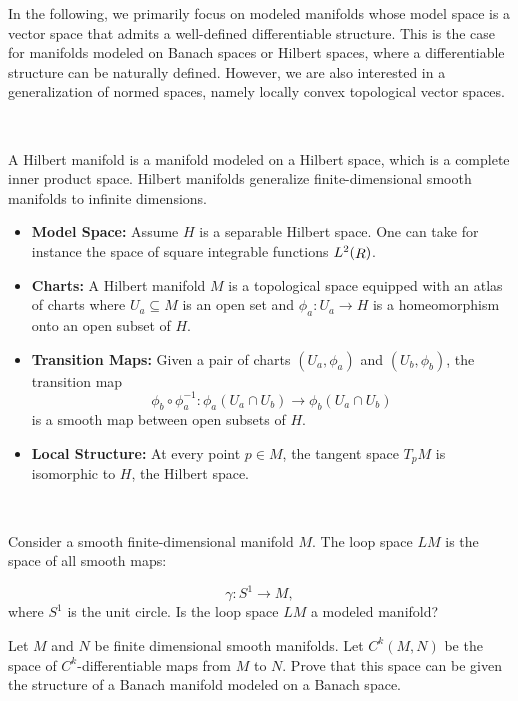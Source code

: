 \vspace{5pt}%

In the following, we primarily focus on modeled manifolds whose model space is a vector space that admits a well-defined differentiable structure. This is the case for manifolds modeled on Banach spaces or Hilbert spaces, where a differentiable structure can be naturally defined. However, we are also interested in a generalization of normed spaces, namely locally convex topological vector spaces. 

\, 
\begin{example}
A Hilbert manifold is a manifold modeled on a Hilbert space, which is a complete inner product space. 
Hilbert manifolds generalize finite-dimensional smooth manifolds to infinite dimensions.

\begin{itemize}
    \item {\bf Model Space:} Assume $H$ is a separable Hilbert space. One can take for instance the space of square integrable functions $L^2(\mathop{R})$.
    \item {\bf Charts:} A Hilbert manifold $M$ is a topological space equipped with an atlas of charts where $U_a\subseteq M$ is an open set and $\phi_a:U_a\to H$ is a homeomorphism onto an open subset of $H$.
    \item {\bf Transition Maps:} Given a pair of charts $(U_a,\phi_a)$ and $(U_b,\phi_b)$, the transition map 
    \[\phi_b\circ \phi_a^{-1}:\phi_a(U_a\cap U_b)\to \phi_b(U_a\cap U_b) \]
    is a smooth map between open subsets of $H$.
    \item {\bf Local Structure:} At every point $p\in M$, the tangent space $T_pM$ is isomorphic to $H$, the Hilbert space. 
\end{itemize}
\end{example}

\,

\begin{ex}\label{Ex:LoopSpace}
Consider a smooth finite-dimensional manifold $M$. The loop space $LM$ is the space of all smooth maps:

\[\gamma:S^1\to M,\]
where $S^1$ is the unit circle. Is the loop space $LM$ a modeled manifold? 
\end{ex}

\begin{ex}\label{Ex:BanSpace}
Let $M$ and $N$ be finite dimensional smooth manifolds. Let $C^k(M,N)$ be the space of $C^k$-differentiable maps from $M$ to $N$. Prove that  this space can be given the structure of a Banach manifold modeled on a Banach space.
\end{ex}




